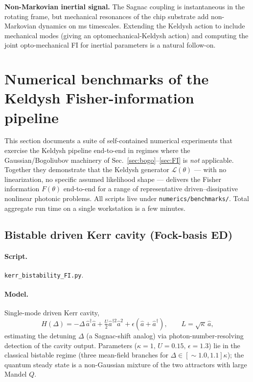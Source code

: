 \documentclass[11pt]{article}
\begin{document}
\begin{open}
\textbf{Non-Markovian inertial signal.}  The Sagnac coupling is
instantaneous in the rotating frame, but mechanical resonances of
the chip substrate add non-Markovian dynamics on ms timescales.
Extending the Keldysh action to include mechanical modes (giving an
optomechanical-Keldysh action) and computing the joint opto-mechanical
FI for inertial parameters is a natural follow-on.
\end{open}

\section{Numerical benchmarks of the Keldysh Fisher-information pipeline}
\label{sec:numerical_benchmarks}

This section documents a suite of self-contained numerical experiments
that exercise the Keldysh pipeline end-to-end in regimes where the
Gaussian/Bogoliubov machinery of Sec.~\ref{sec:bogo}--\ref{sec:FI} is
\emph{not} applicable.  Together they demonstrate that the Keldysh
generator $\mathcal{L}(\theta)$ --- with no linearization, no specific
assumed likelihood shape --- delivers the Fisher information
$F(\theta)$ end-to-end for a range of representative driven--dissipative
nonlinear photonic problems.  All scripts live under
\texttt{numerics/benchmarks/}.  Total aggregate run time on a single
workstation is a few minutes.

\subsection{Bistable driven Kerr cavity (Fock-basis ED)}
\label{sec:num_bistable}

\paragraph{Script.} \texttt{kerr\_bistability\_FI.py}.

\paragraph{Model.} Single-mode driven Kerr cavity,
\begin{equation}
  H(\Delta) = -\Delta\,\hat a^\dag\hat a + \tfrac{U}{2}\hat a^{\dag 2}\hat a^2
               + \epsilon(\hat a + \hat a^\dag),\qquad
  L = \sqrt{\kappa}\,\hat a,
\end{equation}
estimating the detuning $\Delta$ (a Sagnac-shift analog) via
photon-number-resolving detection of the cavity output.  Parameters
($\kappa=1,\,U=0.15,\,\epsilon=1.3$) lie in the classical bistable
regime (three mean-field branches for $\Delta\in[\sim 1.0, 1.1]\kappa$);
the quantum steady state is a non-Gaussian mixture of the two attractors
with large Mandel $Q$.
\end{document}
